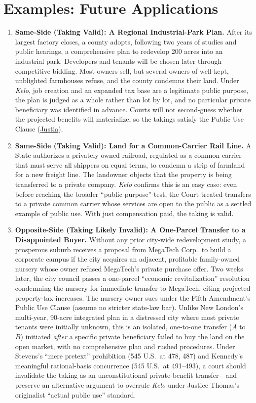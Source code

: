 \documentclass[12pt]{article}
\begin{document}
\section{Examples: Future Applications}
\begin{enumerate}

\item \textbf{Same-Side (Taking Valid): A Regional Industrial-Park Plan.} After its largest factory closes, a county adopts, following two years of studies and public hearings, a comprehensive plan to redevelop 200 acres into an industrial park. Developers and tenants will be chosen later through competitive bidding. Most owners sell, but several owners of well-kept, unblighted farmhouses refuse, and the county condemns their land. Under \textit{Kelo}, job creation and an expanded tax base are a legitimate public purpose, the plan is judged as a whole rather than lot by lot, and no particular private beneficiary was identified in advance. Courts will not second-guess whether the projected benefits will materialize, so the takings satisfy the Public Use Clause (\href{https://supreme.justia.com/cases/federal/us/545/469/}{Justia}).

\item \textbf{Same-Side (Taking Valid): Land for a Common-Carrier Rail Line.} A State authorizes a privately owned railroad, regulated as a common carrier that must serve all shippers on equal terms, to condemn a strip of farmland for a new freight line. The landowner objects that the property is being transferred to a private company. \textit{Kelo} confirms this is an easy case: even before reaching the broader ``public purpose'' test, the Court treated transfers to a private common carrier whose services are open to the public as a settled example of public use. With just compensation paid, the taking is valid.

\item \textbf{Opposite-Side (Taking Likely Invalid): A One-Parcel Transfer to a Disappointed Buyer.} Without any prior city-wide redevelopment study, a prosperous suburb receives a proposal from MegaTech Corp.\ to build a corporate campus if the city acquires an adjacent, profitable family-owned nursery whose owner refused MegaTech's private purchase offer. Two weeks later, the city council passes a one-parcel ``economic revitalization'' resolution condemning the nursery for immediate transfer to MegaTech, citing projected property-tax increases. The nursery owner sues under the Fifth Amendment's Public Use Clause (assume no stricter state-law bar). Unlike New London's multi-year, 90-acre integrated plan in a distressed city where most private tenants were initially unknown, this is an isolated, one-to-one transfer ($A$ to $B$) initiated \textit{after} a specific private beneficiary failed to buy the land on the open market, with no comprehensive plan and rushed procedures. Under Stevens's ``mere pretext'' prohibition (545 U.S.\ at 478, 487) and Kennedy's meaningful rational-basis concurrence (545 U.S.\ at 491--493), a court should invalidate the taking as an unconstitutional private-benefit transfer---and preserve an alternative argument to overrule \textit{Kelo} under Justice Thomas's originalist ``actual public use'' standard.


\end{enumerate}
\end{document}
